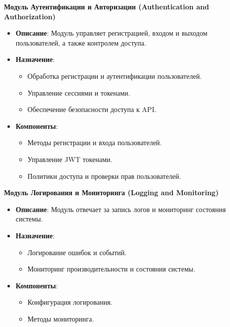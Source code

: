 \documentclass[12pt, russian]{extarticle}
\begin{document}
\begin{spacing}{1.5}
\par \noindent \textbf{Модуль Аутентификации и Авторизации (Authentication and Authorization)}
\begin{itemize}
    \item \textbf{Описание}: Модуль управляет регистрацией, входом и выходом пользователей, а также контролем доступа.
    \item \textbf{Назначение}:
    \begin{itemize}
        \item Обработка регистрации и аутентификации пользователей.
        \item Управление сессиями и токенами.
        \item Обеспечение безопасности доступа к API.
    \end{itemize}
    \item \textbf{Компоненты}:
    \begin{itemize}
        \item Методы регистрации и входа пользователей.
        \item Управление JWT токенами.
        \item Политики доступа и проверки прав пользователей.
    \end{itemize}
\end{itemize}

\par \noindent \textbf{Модуль Логирования и Мониторинга (Logging and Monitoring)}
\begin{itemize}
    \item \textbf{Описание}: Модуль отвечает за запись логов и мониторинг состояния системы.
    \item \textbf{Назначение}:
    \begin{itemize}
        \item Логирование ошибок и событий.
        \item Мониторинг производительности и состояния системы.
    \end{itemize}
    \item \textbf{Компоненты}:
    \begin{itemize}
        \item Конфигурация логирования.
        \item Методы мониторинга.
    \end{itemize}
\end{itemize}


\end{spacing}
\end{document}
